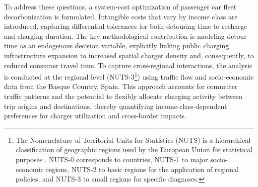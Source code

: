     To address these questions, a system-cost optimization of passenger car fleet decarbonization is formulated. Intangible costs that vary by income class are introduced, capturing differential tolerances for both detouring time to recharge and charging duration. The key methodological contribution is modeling detour time as an endogenous decision variable, explicitly linking public charging infrastructure expansion to increased spatial charger density and, consequently, to reduced consumer travel time. To capture cross-regional interactions, the analysis is conducted at the regional level (NUTS-3\footnote{The Nomenclature of Territorial Units for Statistics (NUTS) is a hierarchical classification of geographic regions used by the European Union for statistical purposes \citep{eurostat_nuts}. NUTS-0 corresponds to countries, NUTS-1 to major socio-economic regions, NUTS-2 to basic regions for the application of regional policies, and NUTS-3 to small regions for specific diagnoses.}) using traffic flow and socio-economic data from the Basque Country, Spain. This approach accounts for commuter traffic patterns and the potential to flexibly allocate charging activity between trip origins and destinations, thereby quantifying income-class-dependent preferences for charger utilization and cross-border impacts. 
    
